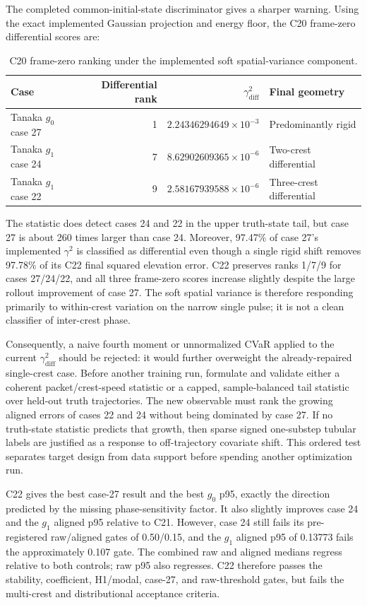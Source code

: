 \documentclass[11pt]{article}
\begin{document}
The completed common-initial-state discriminator gives a sharper warning.
Using the exact implemented Gaussian projection and energy floor, the C20
frame-zero differential scores are:
\begin{table}[htbp]
\centering
\small
\begin{tabular}{lrrl}
\toprule
Case & Differential rank & $\gamma_{\mathrm{diff}}^2$ & Final geometry \\
\midrule
Tanaka $g_0$ case 27 & 1 & $2.24346294649\times10^{-3}$ & Predominantly rigid \\
Tanaka $g_1$ case 24 & 7 & $8.62902609365\times10^{-6}$ & Two-crest differential \\
Tanaka $g_1$ case 22 & 9 & $2.58167939588\times10^{-6}$ & Three-crest differential \\
\bottomrule
\end{tabular}
\caption{C20 frame-zero ranking under the implemented soft spatial-variance
component.}
\label{tab:frame-zero-differential-ranks}
\end{table}
The statistic does detect cases 24 and 22 in the upper truth-state tail, but
case 27 is about 260 times larger than case 24.  Moreover, 97.47\% of case
27's implemented \(\gamma^2\) is classified as differential even though a
single rigid shift removes 97.78\% of its C22 final squared elevation error.
C22 preserves ranks 1/7/9 for cases 27/24/22, and all three frame-zero scores
increase slightly despite the large rollout improvement of case 27.  The soft
spatial variance is therefore responding primarily to within-crest variation
on the narrow single pulse; it is not a clean classifier of inter-crest phase.

Consequently, a naive fourth moment or unnormalized CVaR applied to the current
\(\gamma_{\mathrm{diff}}^2\) should be rejected: it would further overweight
the already-repaired single-crest case.  Before another training run, formulate
and validate either a coherent packet/crest-speed statistic or a capped,
sample-balanced tail statistic over held-out truth trajectories.  The new
observable must rank the growing aligned errors of cases 22 and 24 without
being dominated by case 27.  If no truth-state statistic predicts that growth,
then sparse signed one-substep tubular labels are justified as a response to
off-trajectory covariate shift.  This ordered test separates target design from
data support before spending another optimization run.

C22 gives the best case-27 result and the best \(g_0\) p95, exactly the
direction predicted by the missing phase-sensitivity factor.  It also slightly
improves case 24 and the \(g_1\) aligned p95 relative to C21.  However, case 24
still fails its pre-registered raw/aligned gates of 0.50/0.15, and the
\(g_1\) aligned p95 of 0.13773 fails the approximately 0.107 gate.  The
combined raw and aligned medians regress relative to both controls; raw p95
also regresses.  C22 therefore passes the stability, coefficient, H1/modal,
case-27, and raw-threshold gates, but fails the multi-crest and distributional
acceptance criteria.
\end{document}
